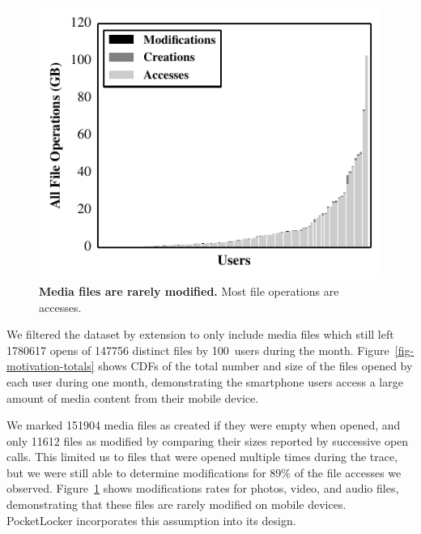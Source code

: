 \begin{figure}[t]

\includegraphics{./figures/pocketlocker/OperationPercentageGraph.pdf}

\caption{\small \textbf{Media files are rarely modified.} Most file
operations are accesses.}

\label{fig-motivation-modification}

\end{figure}

We filtered the dataset by extension to only include media files
which still left \num{1780617} opens of
\num{147756} distinct files by 100~users during the month.
Figure~\ref{fig-motivation-totals} shows CDFs of the total number and size of
the files opened by each \PhoneLab{} user during one month, demonstrating the
smartphone users access a large amount of media content from their mobile
device.

We marked \num{151904} media files as created if they were empty when opened,
and only \num{11612} files as modified by comparing their sizes reported by
successive open calls. This limited us to files that were opened multiple
times during the trace, but we were still able to determine modifications for
89\% of the file accesses we observed.
Figure~\ref{fig-motivation-modification} shows modifications rates for
photos, video, and audio files, demonstrating that these files are rarely
modified on mobile devices. PocketLocker incorporates this assumption into
its design.

